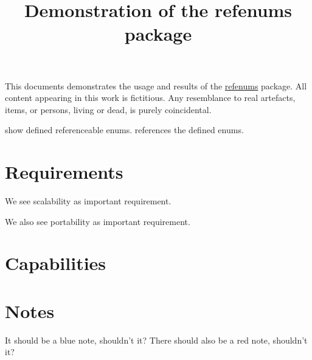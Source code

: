 \documentclass[parskip=full]{scrartcl}
\begin{document}
\title{Demonstration of the refenums package}
\date{}
\author{}
\maketitle

\vspace{-12ex}
This documents demonstrates the usage and results of the \href{http://mirror.ctan.org/tex-archive/macros/latex/contrib/refenums/}{refenums} package.
All content appearing in this work is fictitious.
Any resemblance to real artefacts, items, or persons, living or dead, is purely coincidental.

 show defined referenceable enums.
 references the defined enums.

\tableofcontents
\clearpage








\section{Requirements}
\label{sec:reqs}
We see scalability as important requirement.

We also see portability as important requirement.


\section{Capabilities}

\section{Notes}
 It should be a blue note, shouldn't it?
 There should also be a red note, shouldn't it?
\end{document}
